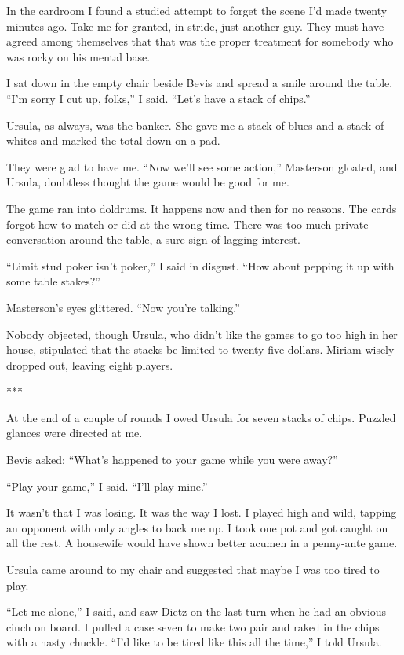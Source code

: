 \documentclass{novel}
\begin{document}
{In the cardroom I found a studied attempt to forget the scene I’d made twenty minutes ago. Take me for granted, in stride, just another guy. They must have agreed among themselves that that was the proper treatment for somebody who was rocky on his mental base.

I sat down in the empty chair beside Bevis and spread a smile around the table. “I’m sorry I cut up, folks,” I said. “Let’s have a stack of chips.”

Ursula, as always, was the banker. She gave me a stack of blues and a stack of whites and marked the total down on a pad.

They were glad to have me. “Now we’ll see some action,” Masterson gloated, and Ursula, doubtless thought the game would be good for me.

The game ran into doldrums. It happens now and then for no reasons. The cards forgot how to match or did at the wrong time. There was too much private conversation around the table, a sure sign of lagging interest.

“Limit stud poker isn’t poker,” I said in disgust. “How about pepping it up with some table stakes?”

Masterson’s eyes glittered. “Now you’re talking.”

Nobody objected, though Ursula, who didn’t like the games to go too high in her house, stipulated that the stacks be limited to twenty-five dollars. Miriam wisely dropped out, leaving eight players.

***

At the end of a couple of rounds I owed Ursula for seven stacks of chips. Puzzled glances were directed at me.

Bevis asked: “What’s happened to your game while you were away?”

“Play your game,” I said. “I’ll play mine.”

It wasn’t that I was losing. It was the way I lost. I played high and wild, tapping an opponent with only angles to back me up. I took one pot and got caught on all the rest. A housewife would have shown better acumen in a penny-ante game.

Ursula came around to my chair and suggested that maybe I was too tired to play.

“Let me alone,” I said, and saw Dietz on the last turn when he had an obvious cinch on board. I pulled a case seven to make two pair and raked in the chips with a nasty chuckle. “I’d like to be tired like this all the time,” I told Ursula.

}
\end{document}
